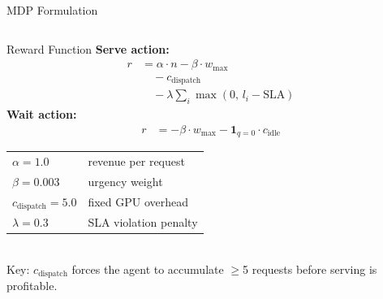 \documentclass[aspectratio=169]{beamer}
\begin{document}
\begin{frame}{MDP Formulation}
\begin{columns}[T]
      \begin{block}{Reward Function}
        \textbf{Serve action:}
        \begin{align*}
          r &= \alpha \cdot n - \beta \cdot w_{\max}\\
            &\quad - c_{\text{dispatch}}\\
            &\quad - \lambda \textstyle\sum_i \max(0,\, l_i - \text{SLA})
        \end{align*}
        \textbf{Wait action:}
        \begin{align*}
          r &= -\beta \cdot w_{\max} - \mathbf{1}_{q=0}\cdot c_{\text{idle}}
        \end{align*}
        \vspace{4pt}
        \renewcommand{\arraystretch}{1.15}
        \begin{tabular}{@{}ll@{}}
          $\alpha=1.0$ & revenue per request \\
          $\beta=0.003$ & urgency weight \\
          $c_{\text{dispatch}}=5.0$ & fixed GPU overhead \\
          $\lambda=0.3$ & SLA violation penalty \\
        \end{tabular}\\[4pt]
        \footnotesize Key: $c_\text{dispatch}$ forces the agent to
        accumulate $\geq$5 requests before serving is profitable.
      \end{block}
  \end{columns}
\end{frame}
\end{document}

